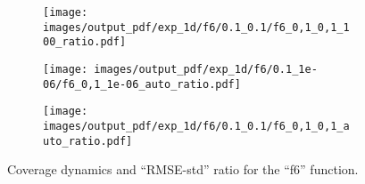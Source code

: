 \documentclass[a4paper,14pt]{extarticle}
\begin{document}
\begin{figure}
  \begin{subfigure}[b]{0.25\linewidth}
    \texttt{[image: images/output\_pdf/exp\_1d/f6/0.1\_0.1/f6\_0,1\_0,1\_100\_ratio.pdf]}
    \caption{} \label{fig:f6_1d_high_noise_c2}
  \end{subfigure}%
  \begin{subfigure}[b]{0.25\linewidth}
    \texttt{[image: images/output\_pdf/exp\_1d/f6/0.1\_1e-06/f6\_0,1\_1e-06\_auto\_ratio.pdf]}
    \caption{} \label{fig:f6_1d_high_noise_c3}
  \end{subfigure}%
  \begin{subfigure}[b]{0.25\linewidth}
    \texttt{[image: images/output\_pdf/exp\_1d/f6/0.1\_0.1/f6\_0,1\_0,1\_auto\_ratio.pdf]}
    \caption{} \label{fig:f6_1d_high_noise_c4}
  \end{subfigure}%
  \caption{Coverage dynamics and ``RMSE-std'' ratio for the ``f6'' function.}
  \label{fig:f6_1d_high_noise}
\end{figure}
\end{document}

